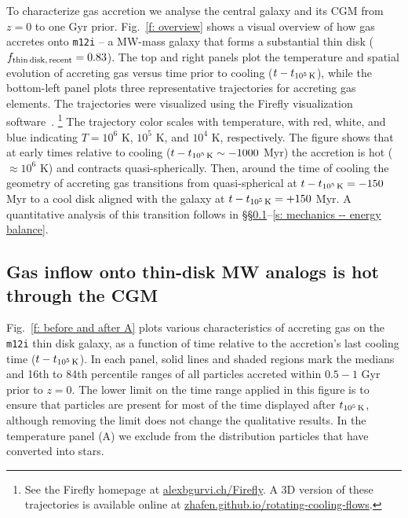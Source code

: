 \documentclass[fleqn,usenatbib]{mnras}
\newcommand{\fthin}{f_{\rm thin\,disk,\,recent}}
\newcommand{\tcools}{t_{10^5\,{\rm K}}}
\begin{document}
To characterize gas accretion we analyse the central galaxy and its CGM from $z=0$ to one Gyr prior.
Fig.~\ref{f: overview} shows a visual overview of how gas accretes onto \texttt{m12i} -- a MW-mass galaxy that forms a substantial thin disk ($\fthin = 0.83$). 
The top and right panels plot the temperature and spatial evolution of accreting gas versus time prior to cooling ($t-\tcools$), while the bottom-left panel plots three representative trajectories for accreting gas elements.
The trajectories were visualized using the Firefly visualization software~\citep{Geller2018}.
\footnote{See the Firefly homepage at \url{alexbgurvi.ch/Firefly}.
A 3D version of these trajectories is available online at \url{zhafen.github.io/rotating-cooling-flows}.}
The trajectory color scales with temperature, with red, white, and blue indicating $T=10^6$ K, $10^5$ K, and $10^4$ K, respectively.
The figure shows that at early times relative to cooling ($t-\tcools \sim -1000$ Myr) the accretion is hot ($\approx10^6$ K) and contracts quasi-spherically.
Then, around the time of cooling the geometry of accreting gas transitions from quasi-spherical at $t - \tcools=-150$ Myr to a cool disk aligned with the galaxy at $t - \tcools=+ 150$ Myr.
A quantitative analysis of this transition follows in \S\S\ref{s: characteristics -- inflowing gas phase}--\ref{s: mechanics -- energy balance}.

\subsection{Gas inflow onto thin-disk MW analogs is hot through the CGM}
\label{s: characteristics -- inflowing gas phase}

Fig.~\ref{f: before and after A} plots various characteristics of accreting gas on the \texttt{m12i} thin disk galaxy, as a function of time relative to the accretion's last cooling time ($t - \tcools$).
In each panel, solid lines and shaded regions mark the medians and 16th to 84th percentile ranges of all particles accreted within $0.5-1$ Gyr prior to $z=0$.
The lower limit on the time range applied in this figure is to ensure that particles are present for most of the time displayed after $\tcools$, although removing the limit does not change the qualitative results.
In the temperature panel (A) we exclude from the distribution particles that have converted into stars. 
\end{document}
